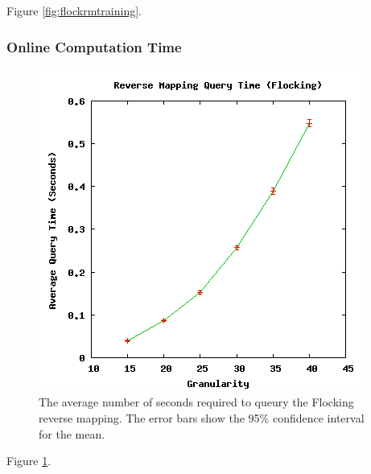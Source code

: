 Figure \ref{fig:flockrmtraining}.

  \subsubsection{Online Computation Time}

\begin{figure}[ht]
\centering
\includegraphics[scale=.5]{images/results_flocking/rmquery.png}
\caption{The average number of seconds required to queury the Flocking reverse mapping.
The error bars show the 95\% confidence interval for the mean.}
\label{fig:flockrmquery}
\end{figure}

Figure \ref{fig:flockrmquery}.




